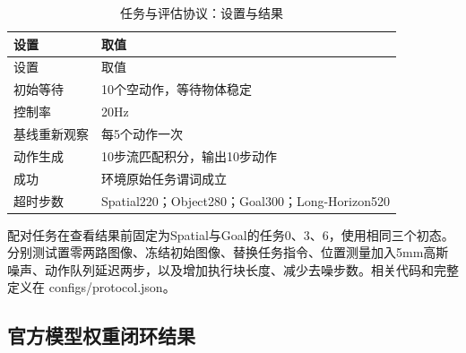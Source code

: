 \FloatBarrier\begingroup\small\setlength{\tabcolsep}{2.5pt}
\begin{longtable}[]{@{}
  >{\raggedright\arraybackslash}p{}
  >{\raggedright\arraybackslash}p{}@{}}
\caption{任务与评估协议：设置与结果}\label{tab:s08-1}\tabularnewline
\toprule\noalign{}
\begin{minipage}[b]{\linewidth}\raggedright
设置
\end{minipage} & \begin{minipage}[b]{\linewidth}\raggedright
取值
\end{minipage} \\
\midrule\noalign{}
\endfirsthead
\toprule\noalign{}
\begin{minipage}[b]{\linewidth}\raggedright
设置
\end{minipage} & \begin{minipage}[b]{\linewidth}\raggedright
取值
\end{minipage} \\
\midrule\noalign{}
\endhead
\bottomrule\noalign{}
\endlastfoot
初始等待 & 10个空动作，等待物体稳定 \\
控制率 & 20Hz \\
基线重新观察 & 每5个动作一次 \\
动作生成 & 10步流匹配积分，输出10步动作 \\
成功 & 环境原始任务谓词成立 \\
超时步数 & Spatial220；Object280；Goal300；Long-Horizon520 \\
\end{longtable}\endgroup

配对任务在查看结果前固定为Spatial与Goal的任务0、3、6，使用相同三个初态。分别测试置零两路图像、冻结初始图像、替换任务指令、位置测量加入5mm高斯噪声、动作队列延迟两步，以及增加执行块长度、减少去噪步数。相关代码和完整定义在 configs/protocol.json。

\subsection{官方模型权重闭环结果}\label{s08-detail-4}


